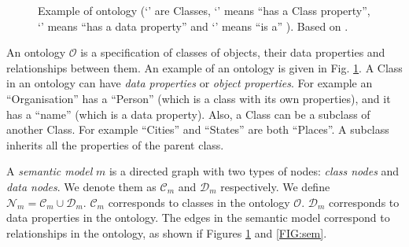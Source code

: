 \documentclass[letterpaper]{article} %
\begin{document}
\begin{figure}[ht]
\caption{Example of ontology
(`' are Classes, `' means ``has a Class property'', 
`' 
means ``has 
a data 
property'' and 
`' means ``is a'' ). Based on 
\cite{Taheriyan2013}.
}
\label{FIG:onto}
\end{figure}




An ontology $\mathcal{O}$ is a specification of classes of objects, their 
data properties and relationships between them.
An example of an ontology is given in Fig. \ref{FIG:onto}. 
A Class in an ontology can have \emph{data properties} or \emph{object properties}. 
For example an ``Organisation'' has a ``Person'' 
(which is a class with its own properties), and it has a ``name'' (which 
is a data property). 
Also, a Class can be a subclass of another Class. 
For 
example ``Cities'' and ``States'' are both ``Places''. 
A subclass inherits all the properties of the parent class.

A \emph{semantic model} $m$ is a directed graph with two types of nodes: 
\emph{class nodes} and \emph{data nodes}. 
We denote them as $\mathcal{C}_m$ and $\mathcal{D}_m$ respectively.
 We define $\mathcal{N}_m = \mathcal{C}_m \cup 
\mathcal{D}_m$. $ \mathcal{C}_m$ corresponds to classes in the ontology 
$\mathcal{O}$. $\mathcal{D}_m$ corresponds to data 
properties in the ontology. 
The edges in the semantic model correspond to relationships in the ontology, as shown if Figures \ref{FIG:onto} and \ref{FIG:sem}.
\end{document}
